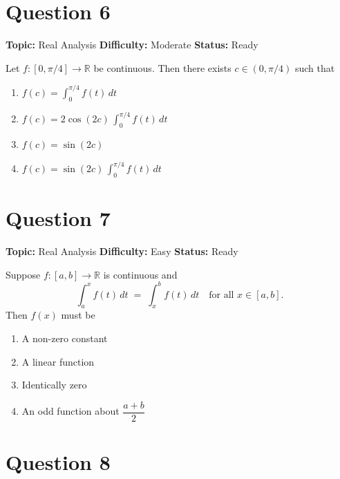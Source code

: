 \documentclass[11pt]{article}
\begin{document}
\newpage

\section*{Question 6}


\noindent\textbf{Topic:} Real Analysis \quad \textbf{Difficulty:} Moderate \quad \textbf{Status:} Ready



Let $f:[0,\pi/4]\to\mathbb{R}$ be continuous. Then there exists $c\in(0,\pi/4)$ such that
\begin{enumerate}[label=(\Alph*)]
\item $f(c) = \int_0^{\pi/4} f(t)\,dt$
\item $f(c) = 2\cos(2c)\,\int_0^{\pi/4} f(t)\,dt$
\item $f(c) = \sin(2c)$
\item $f(c) = \sin(2c)\,\int_0^{\pi/4} f(t)\,dt$
\end{enumerate}

\newpage

\section*{Question 7}


\noindent\textbf{Topic:} Real Analysis \quad \textbf{Difficulty:} Easy \quad \textbf{Status:} Ready



Suppose $f:[a,b]\to\mathbb{R}$ is continuous and
\[
\int_a^x f(t)\,dt \;=\; \int_x^b f(t)\,dt \quad \text{for all } x \in [a,b].
\]
Then $f(x)$ must be
\begin{enumerate}[label=(\Alph*)]
\item A non-zero constant
\item A linear function
\item Identically zero
\item An odd function about $\dfrac{a+b}{2}$
\end{enumerate}

\newpage

\section*{Question 8}

\end{document}
